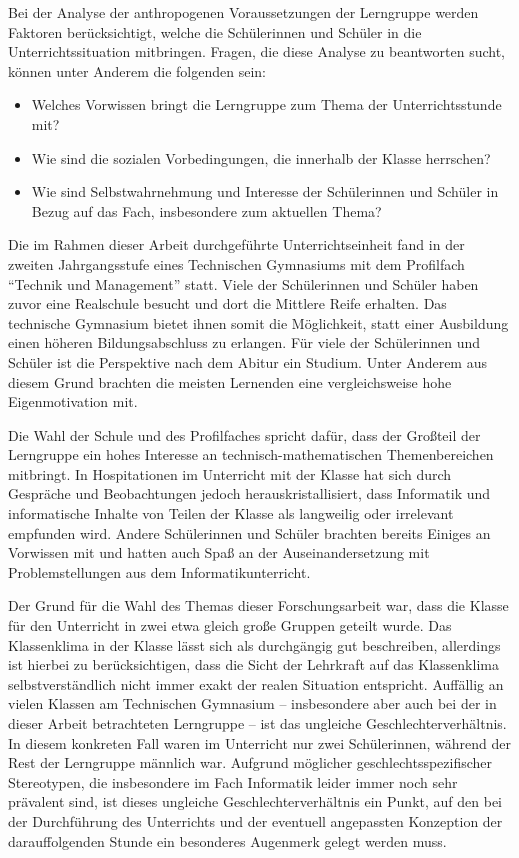 Bei der Analyse der anthropogenen Voraussetzungen der Lerngruppe werden Faktoren berücksichtigt, welche die Schülerinnen und Schüler in die Unterrichtssituation mitbringen.
Fragen, die diese Analyse zu beantworten sucht, können unter Anderem die folgenden sein:
\begin{itemize}
	\item Welches Vorwissen bringt die Lerngruppe zum Thema der Unterrichtsstunde mit?
	\item Wie sind die sozialen Vorbedingungen, die innerhalb der Klasse herrschen?
	\item Wie sind Selbstwahrnehmung und Interesse der Schülerinnen und Schüler in Bezug auf das Fach, insbesondere zum aktuellen Thema?
\end{itemize}

Die im Rahmen dieser Arbeit durchgeführte Unterrichtseinheit fand in der zweiten Jahrgangsstufe eines Technischen Gymnasiums mit dem Profilfach ``Technik und Management'' statt.
Viele der Schülerinnen und Schüler haben zuvor eine Realschule besucht und dort die Mittlere Reife erhalten.
Das technische Gymnasium bietet ihnen somit die Möglichkeit, statt einer Ausbildung einen höheren Bildungsabschluss zu erlangen.
Für viele der Schülerinnen und Schüler ist die Perspektive nach dem Abitur ein Studium.
Unter Anderem aus diesem Grund brachten die meisten Lernenden eine vergleichsweise hohe Eigenmotivation mit.

Die Wahl der Schule und des Profilfaches spricht dafür, dass der Großteil der Lerngruppe ein hohes Interesse an technisch-mathematischen Themenbereichen mitbringt.
In Hospitationen im Unterricht mit der Klasse hat sich durch Gespräche und Beobachtungen jedoch herauskristallisiert, dass Informatik und informatische Inhalte von Teilen der Klasse als langweilig oder irrelevant empfunden wird.
Andere Schülerinnen und Schüler brachten bereits Einiges an Vorwissen mit und hatten auch Spaß an der Auseinandersetzung mit Problemstellungen aus dem Informatikunterricht.

Der Grund für die Wahl des Themas dieser Forschungsarbeit war, dass die Klasse für den Unterricht in zwei etwa gleich große Gruppen geteilt wurde.
Das Klassenklima in der Klasse lässt sich als durchgängig gut beschreiben, allerdings ist hierbei zu berücksichtigen, dass die Sicht der Lehrkraft auf das Klassenklima selbstverständlich nicht immer exakt der realen Situation entspricht.
Auffällig an vielen Klassen am Technischen Gymnasium -- insbesondere aber auch bei der in dieser Arbeit betrachteten Lerngruppe -- ist das ungleiche Geschlechterverhältnis.
In diesem konkreten Fall waren im Unterricht nur zwei Schülerinnen, während der Rest der Lerngruppe männlich war.
Aufgrund möglicher geschlechtsspezifischer Stereotypen, die insbesondere im Fach Informatik leider immer noch sehr prävalent sind, ist dieses ungleiche Geschlechterverhältnis ein Punkt, auf den bei der Durchführung des Unterrichts und der eventuell angepassten Konzeption der darauffolgenden Stunde ein besonderes Augenmerk gelegt werden muss.

